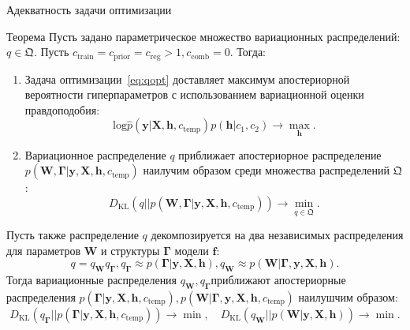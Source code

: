 \documentclass[usenames,dvipsnames,11pt,pdf,utf8,russian,aspectratio=43]{beamer}
\begin{document}
\begin{frame}{Адекватность задачи оптимизации}
\tiny   
\begin{block}{Теорема}
Пусть задано параметрическое множество вариационных распределений: $q \in \mathfrak{Q}$. 
Пусть $c_\text{train} = c_\text{prior}=c_\text{reg}>1, c_{\text{comb}}=0$. Тогда:
\begin{enumerate}
\item Задача оптимизации~\eqref{eq:qopt} доставляет максимум апостериорной вероятности гиперпараметров с использованием вариационной оценки правдоподобия:
\[
    \text{log}\hat{p}(\mathbf{y}|\mathbf{X}, \mathbf{h}, c_\text{temp})p(\mathbf{h}|c_1,c_2) \to \max_{\mathbf{h}}.
\]
\item Вариационное распределение $q$ приближает апостериорное распределение $p(\mathbf{W}, \boldsymbol{\Gamma}|\mathbf{y}, \mathbf{X}, \mathbf{h}, c_\text{temp})$ наилучим образом среди множества распределений $\mathfrak{Q}$:
\[
    {D}_\text{KL}(q||p(\mathbf{W}, \boldsymbol{\Gamma}|\mathbf{y}, \mathbf{X}, \mathbf{h}, c_\text{temp})) \to \min_{q \in \mathfrak{Q}}.
\]
\end{enumerate}
\end{block}
\begin{block}{}
Пусть также распределение $q$ декомпозируется на два независимых распределения для параметров $\mathbf{W}$ и структуры $\boldsymbol{\Gamma}$ модели $\mathbf{f}$:
\[
    q = q_{\mathbf{W}}q_{\boldsymbol{\Gamma}}, q_{\boldsymbol{\Gamma}} \approx p(\boldsymbol{\Gamma}|\mathbf{y}, \mathbf{X}, \mathbf{h}), q_{\mathbf{W}} \approx p(\mathbf{W}|\boldsymbol{\Gamma},\mathbf{y}, \mathbf{X}, \mathbf{h}).
\]
Тогда вариационные распределения $q_{\mathbf{W}}, q_{\boldsymbol{\Gamma}}$приближают апостериорные распределения $ p(\boldsymbol{\Gamma}|\mathbf{y}, \mathbf{X}, \mathbf{h}, c_\text{temp}), p(\mathbf{W}|\boldsymbol{\Gamma},\mathbf{y}, \mathbf{X}, \mathbf{h}, c_\text{temp})$ наилушчим образом:
\[
    {D}_\text{KL}(q_{\boldsymbol{\Gamma}}||p(\boldsymbol{\Gamma}|\mathbf{y}, \mathbf{X}, \mathbf{h}, c_\text{temp})) \to \min, \quad
    {D}_\text{KL}(q_{\mathbf{W}}||p(\mathbf{W}|\mathbf{y}, \mathbf{X}, \mathbf{h})) \to \min.
\]

\end{block}
\end{frame}
\end{document}
